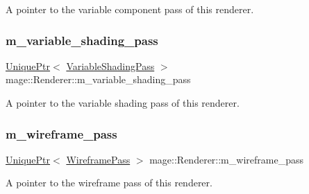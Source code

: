 A pointer to the variable component pass of this renderer. \hypertarget{classmage_1_1_renderer_adb0d48e33a86c3ee481b26165e416487}{}\label{classmage_1_1_renderer_adb0d48e33a86c3ee481b26165e416487} 
\subsubsection{\texorpdfstring{m\+\_\+variable\+\_\+shading\+\_\+pass}{m\_variable\_shading\_pass}}
{\footnotesize\ttfamily \hyperlink{namespacemage_a3316d7143a973e37adf1110f2e80ca31}{Unique\+Ptr}$<$ \hyperlink{classmage_1_1_variable_shading_pass}{Variable\+Shading\+Pass} $>$ mage\+::\+Renderer\+::m\+\_\+variable\+\_\+shading\+\_\+pass\hspace{0.3cm}{\ttfamily [private]}}

A pointer to the variable shading pass of this renderer. \hypertarget{classmage_1_1_renderer_a8c9f28228031337e26725af8213268ed}{}\label{classmage_1_1_renderer_a8c9f28228031337e26725af8213268ed} 
\subsubsection{\texorpdfstring{m\+\_\+wireframe\+\_\+pass}{m\_wireframe\_pass}}
{\footnotesize\ttfamily \hyperlink{namespacemage_a3316d7143a973e37adf1110f2e80ca31}{Unique\+Ptr}$<$ \hyperlink{classmage_1_1_wireframe_pass}{Wireframe\+Pass} $>$ mage\+::\+Renderer\+::m\+\_\+wireframe\+\_\+pass\hspace{0.3cm}{\ttfamily [private]}}

A pointer to the wireframe pass of this renderer. 